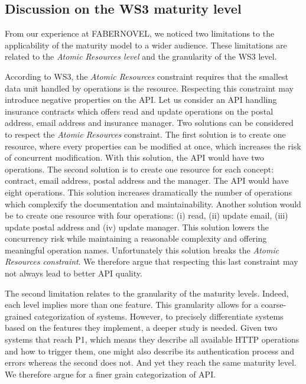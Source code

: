 \subsection{Discussion on the WS3 maturity level}

From our experience at FABERNOVEL, we noticed two limitations to the applicability of the maturity model to a wider audience. These limitations are related to the \textit{Atomic Resources level} and the granularity of the WS3 level.

According to WS3, the \textit{Atomic Resources} constraint requires that the smallest data unit handled by operations is the resource.
Respecting this constraint may introduce negative properties on the API.
Let us consider an API handling insurance contracts which offers read and update operations on the postal address, email address and insurance manager. 
Two solutions can be considered to respect the \textit{Atomic Resources} constraint. 
The first solution is to create one resource, where every properties can be modified at once, which increases the risk of concurrent modification. 
With this solution, the API would have two operations. 
The second solution is to create one resource for each concept: contract, email address, postal address and the manager. The API would have eight operations. This solution increases dramatically the number of operations which complexify the documentation and maintainability.
Another solution would be to create one resource with four operations: (i) read, (ii) update email, (iii) update postal address and (iv) update manager. 
This solution lowers the concurrency risk while maintaining a reasonable complexity and offering meaningful operation names. Unfortunately this solution breaks the \textit{Atomic Resources constraint}. We therefore argue that respecting this last constraint may not always lead to better API quality.

The second limitation relates to the granularity of the maturity levels. Indeed, each level implies more than one feature. This granularity allows for a coarse-grained categorization of systems. 
However, to precisely differentiate systems based on the features they implement, a deeper study is needed. 
Given two systems that reach P1, which means they describe all available HTTP operations and how to trigger them, one might also describe its authentication process and errors whereas the second does not. 
And yet they reach the same maturity level. 
We therefore argue for a finer grain categorization of API.